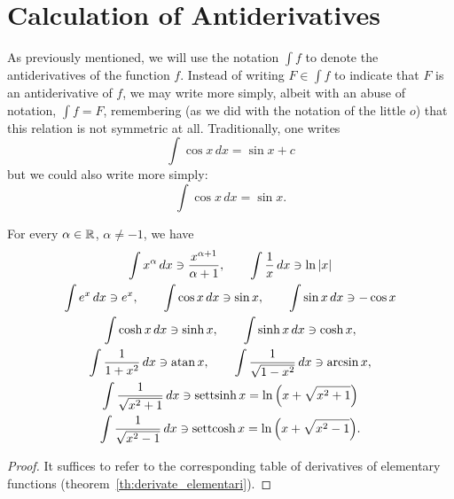 \section{Calculation of Antiderivatives}

As previously mentioned, we will use the notation $\int f$ to denote the
antiderivatives of the function $f$. Instead of writing $F\in \int f$ to
indicate that $F$ is an antiderivative of $f$, we may write more simply, albeit
with an abuse of notation, $\int f = F$, remembering (as we did with the
notation of the little $o$) that this relation is not symmetric at all.
Traditionally, one writes
\begin{equation}\label{eq:4137878}
  \int \cos x\, dx = \sin x + c 
\end{equation}
but we could also write more simply:
%
\begin{equation}\label{eq:489417}
  \int \cos x\, dx = \sin x.
\end{equation}

\begin{theorem}
For every $\alpha \in {\mathbb R}$, $\alpha\neq -1$, we have
\begin{gather*}
\int x^\alpha\, dx \ni \frac{x^{\alpha+1}}{\alpha+1},
\qquad
\int \frac{1}{x}\, dx \ni \ln{\left|x\right|}
\\
\int e^x \, dx \ni e^x,
\qquad
\int \cos x\, dx \ni \sin x,
\qquad
\int \sin x\, dx \ni -\cos x
\\
\int \cosh x \, dx \ni \sinh x,\qquad
\int \sinh x \, dx \ni \cosh x, \\
\int \frac{1}{1+x^2}\, dx \ni \operatorname{atan} x, \qquad
\int \frac{1}{\sqrt{1-x^2}}\, dx \ni \arcsin x, \\
\int \frac{1}{\sqrt{x^2+1}}\, dx \ni \operatorname{settsinh} x = \ln{\left( x+\sqrt{x^2+1} \right)}\\
\int \frac{1}{\sqrt{x^2-1}}\, dx \ni \operatorname{settcosh} x = \ln{\left( x+\sqrt{x^2-1} \right)}.
\end{gather*}
\end{theorem}
%
\begin{proof}
It suffices to refer to the corresponding table of derivatives of elementary
functions (theorem~\ref{th:derivate_elementari}).
\end{proof}

